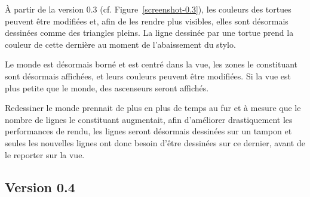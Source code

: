 À partir de la version 0.3 (cf. Figure~\ref{screenshot-0.3}), les couleurs des tortues peuvent être modifiées et, afin de les rendre plus visibles, elles sont désormais dessinées comme des triangles pleins. La ligne dessinée par une tortue prend la couleur de cette dernière au moment de l'abaissement du stylo.

Le monde est désormais borné et est centré dans la vue, les zones le constituant sont désormais affichées, et leurs couleurs peuvent être modifiées. Si la vue est plus petite que le monde, des ascenseurs seront affichés.

Redessiner le monde prennait de plus en plus de temps au fur et à mesure que le nombre de lignes le constituant augmentait, afin d'améliorer drastiquement les performances de rendu, les lignes seront désormais dessinées sur un tampon et seules les nouvelles lignes ont donc besoin d'être dessinées sur ce dernier, avant de le reporter sur la vue.

\subsection{Version 0.4}

